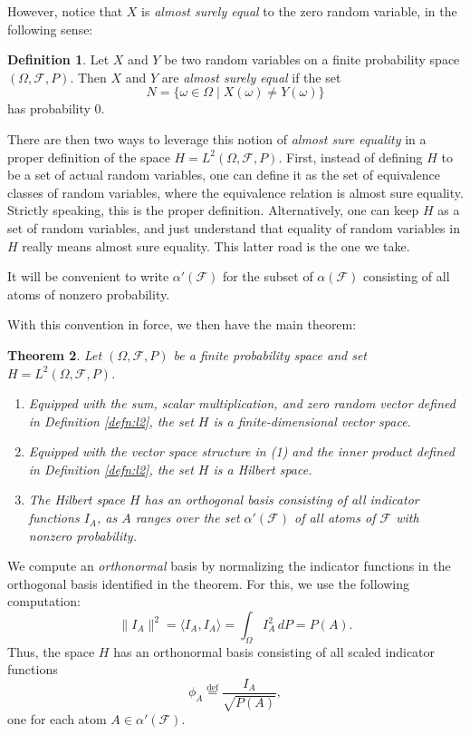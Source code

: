 \documentclass[reqno]{amsart}
\newtheorem{thm}{Theorem}[section]
\theoremstyle{definition}
\newtheorem{defn}[thm]{Definition}
\numberwithin{equation}{section}
\begin{document}
However, notice that $X$ is \textit{almost surely equal} to the zero random variable, in the following sense:

\begin{defn}
Let $X$ and $Y$ be two random variables on a finite probability space $(\Omega, \mathcal{F}, P)$. Then $X$ and $Y$ are \textit{almost surely equal} if the set
	\[
	N = \{\omega \in \Omega \mid X(\omega) \neq Y(\omega) \}
	\]
has probability $0$.
\end{defn}

There are then two ways to leverage this notion of \textit{almost sure equality} in a proper definition of the space $H = L^2(\Omega, \mathcal{F},P)$. First, instead of defining $H$ to be a set of actual random variables, one can define it as the set of equivalence classes of random variables, where the equivalence relation is almost sure equality. Strictly speaking, this is the proper definition. Alternatively, one can keep $H$ as a set of random variables, and just understand that equality of random variables in $H$ really means almost sure equality. This latter road is the one we take.

It will be convenient to write $\alpha'(\mathcal{F})$ for the subset of $\alpha(\mathcal{F})$ consisting of all atoms of nonzero probability.

With this convention in force, we then have the main theorem:

\begin{thm}\label{thm:hilbert}
Let $(\Omega, \mathcal{F}, P)$ be a finite probability space and set $H = L^2(\Omega, \mathcal{F}, P)$.
\begin{enumerate}
\item Equipped with the sum, scalar multiplication, and zero random vector defined in Definition \ref{defn:l2}, the set $H$ is a finite-dimensional vector space.
\item Equipped with the vector space structure in (1) and the inner product defined in Definition \ref{defn:l2}, the set $H$ is a Hilbert space.
\item The Hilbert space $H$ has an orthogonal basis consisting of all indicator functions $I_A$, as $A$ ranges over the set $\alpha'(\mathcal{F})$ of all atoms of $\mathcal{F}$ with nonzero probability.
\end{enumerate}
\end{thm}

We compute an \textit{orthonormal} basis by normalizing the indicator functions in the orthogonal basis identified in the theorem. For this, we use the following computation:
	\[
	\| I_A \|^2 = \langle I_A, I_A \rangle = \int_\Omega I_A^2 \, dP = P(A).
	\]
Thus, the space $H$ has an orthonormal basis consisting of all scaled indicator functions
	\begin{equation}\label{eq:onb}
	\phi_A \stackrel{\text{def}}{=} \frac{I_A}{\sqrt{P(A)}},
	\end{equation}
one for each atom $A\in \alpha'(\mathcal{F})$.
\end{document}
